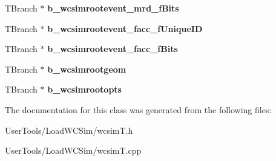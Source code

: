 \begin{DoxyCompactItemize}
\item 
\hypertarget{classwcsimT_a8a77d09bd9f5e0db5edc099bb0c92192}{T\-Branch $\ast$ {\bfseries b\-\_\-wcsimrootevent\-\_\-mrd\-\_\-f\-Bits}}\label{classwcsimT_a8a77d09bd9f5e0db5edc099bb0c92192}

\item 
\hypertarget{classwcsimT_adaa90ed35bfbf8219f06fb1005e73145}{T\-Branch $\ast$ {\bfseries b\-\_\-wcsimrootevent\-\_\-facc\-\_\-f\-Unique\-I\-D}}\label{classwcsimT_adaa90ed35bfbf8219f06fb1005e73145}

\item 
\hypertarget{classwcsimT_aceacfa8310e04b5cc9bd84826f83579e}{T\-Branch $\ast$ {\bfseries b\-\_\-wcsimrootevent\-\_\-facc\-\_\-f\-Bits}}\label{classwcsimT_aceacfa8310e04b5cc9bd84826f83579e}

\item 
\hypertarget{classwcsimT_ae17702643fb9919f5dcde97a06da5687}{T\-Branch $\ast$ {\bfseries b\-\_\-wcsimrootgeom}}\label{classwcsimT_ae17702643fb9919f5dcde97a06da5687}

\item 
\hypertarget{classwcsimT_a671b178fc3a440a83c4f40ccb2e31bc7}{T\-Branch $\ast$ {\bfseries b\-\_\-wcsimrootopts}}\label{classwcsimT_a671b178fc3a440a83c4f40ccb2e31bc7}

\end{DoxyCompactItemize}


The documentation for this class was generated from the following files\-:\begin{DoxyCompactItemize}
\item 
User\-Tools/\-Load\-W\-C\-Sim/wcsim\-T.\-h\item 
User\-Tools/\-Load\-W\-C\-Sim/wcsim\-T.\-cpp\end{DoxyCompactItemize}
